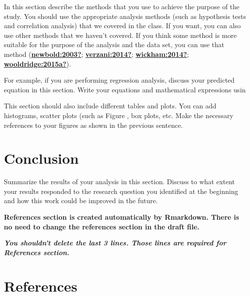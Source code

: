 \documentclass[
  12pt,
]{article}
\begin{document}
In this section describe the methods that you use to achieve the purpose of the study. You should use the appropriate analysis methods (such as hypothesis tests and correlation analysis) that we covered in the class. If you want, you can also use other methods that we haven't covered. If you think some method is more suitable for the purpose of the analysis and the data set, you can use that method (\protect\hyperlink{ref-newbold:2003}{\textbf{newbold:2003?}}; \protect\hyperlink{ref-verzani:2014}{\textbf{verzani:2014?}}; \protect\hyperlink{ref-wickham:2014}{\textbf{wickham:2014?}}; \protect\hyperlink{ref-wooldridge:2015a}{\textbf{wooldridge:2015a?}}).

For example, if you are performing regression analysis, discuss your predicted equation in this section. Write your equations and mathematical expressions usin

This section should also include different tables and plots. You can add histograms, scatter plots (such as Figure , box plots, etc. Make the necessary references to your figures as shown in the previous sentence.

\hypertarget{conclusion}{%
\section{Conclusion}\label{conclusion}}

Summarize the results of your analysis in this section. Discuss to what extent your results responded to the research question you identified at the beginning and how this work could be improved in the future.

\textbf{References section is created automatically by Rmarkdown. There is no need to change the references section in the draft file.}

\textbf{\emph{You shouldn't delete the last 3 lines. Those lines are required for References section.}}

\newpage

\hypertarget{references}{%
\section{References}\label{references}}
\end{document}
